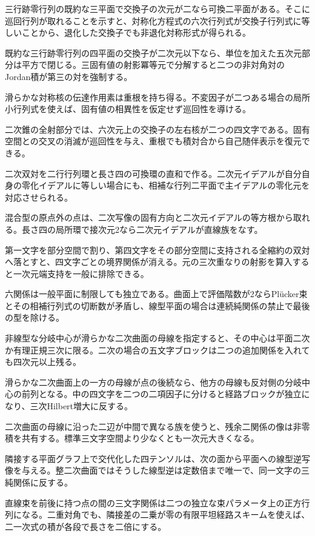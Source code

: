 \documentclass[11pt,a4paper]{ltjsarticle}
\begin{document}
三行跡零行列の既約な三平面で交換子の次元が二なら可換二平面がある。そこに巡回行列が取れることを示すと、対称化方程式の六次行列式が交換子行列式に等しいことから、退化した交換子でも非退化対称形式が得られる。

既約な三行跡零行列の四平面の交換子が二次元以下なら、単位を加えた五次元部分は平方で閉じる。三固有値の射影冪等元で分解すると二つの非対角対のJordan積が第三の対を強制する。

滑らかな対称核の伝達作用素は重根を持ち得る。不変因子が二つある場合の局所小行列式を使えば、固有値の相異性を仮定せず巡回性を導ける。

二次錐の全射部分では、六次元上の交換子の左右核が二つの四文字である。固有空間との交叉の消滅が巡回性を与え、重根でも積対合から自己随伴表示を復元できる。

二次双対を二行行列環と長さ四の可換環の直和で作る。二次元イデアルが自分自身の零化イデアルに等しい場合にも、相補な行列二平面で主イデアルの零化元を対応させられる。

混合型の原点外の点は、二次写像の固有方向と二次元イデアルの等方根から取れる。長さ四の局所環で接次元2なら二次元イデアルが直線族をなす。

第一文字を部分空間で割り、第四文字をその部分空間に支持される全縮約の双対へ落とすと、四文字ごとの境界関係が消える。元の三次重なりの射影を算入すると一次元端支持を一般に排除できる。

六関係は一般平面に制限しても独立である。曲面上で評価階数が2ならPlücker束とその相補行列式の切断数が矛盾し、線型平面の場合は連続純関係の禁止で最後の型を除ける。

非線型な分岐中心が滑らかな二次曲面の母線を指定すると、その中心は平面二次か有理正規三次に限る。二次の場合の五文字ブロックは二つの追加関係を入れても四次元以上残る。

滑らかな二次曲面上の一方の母線が点の後続なら、他方の母線も反対側の分岐中心の前列となる。中の四文字を二つの二項因子に分けると経路ブロックが独立になり、三次Hilbert増大に反する。

二次曲面の母線に沿った二辺が中間で異なる族を使うと、残余二関係の像は非零積を共有する。標準三文字空間より少なくとも一次元大きくなる。

隣接する平面グラフ上で交代化した四テンソルは、次の面から平面への線型逆写像を与える。整二次曲面ではそうした線型逆は定数倍まで唯一で、同一文字の三純関係に反する。

直線束を前後に持つ点の間の三文字関係は二つの独立な束パラメータ上の正方行列になる。二重対角でも、隣接差の二乗が零の有限平坦経路スキームを使えば、二一次式の積が各段で長さを二倍にする。
\end{document}

